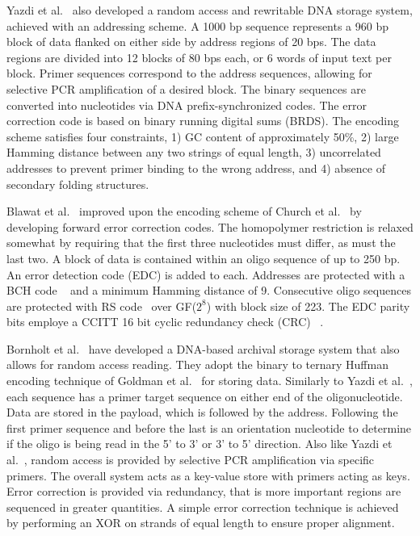 \documentclass{bioinfo}
\begin{document}
Yazdi et al.~\cite{YAZDI2015} also developed a random access and rewritable DNA storage system, achieved with an addressing scheme. A 1000 bp sequence represents a 960 bp block of data flanked on either side by address regions of 20 bps. The data regions are divided into 12 blocks of 80 bps each, or 6 words of input text per block. Primer sequences correspond to the address sequences, allowing for selective PCR amplification of a desired block. The binary sequences are converted into nucleotides via DNA prefix-synchronized codes. The error correction code is based on binary running digital sums (BRDS). The encoding scheme satisfies four constraints, 1) GC content of approximately 50\%, 2) large Hamming distance between any two strings of equal length, 3) uncorrelated addresses to prevent primer binding to the wrong address, and 4) absence of secondary folding structures.

Blawat et al.~\cite{BLAWAT2016} improved upon the encoding scheme of Church et al.~\cite{CHURCH2012} by developing forward error correction codes. The homopolymer restriction is relaxed somewhat by requiring that the first three nucleotides must differ, as must the last two. A block of data is contained within an oligo sequence of up to 250 bp. An error detection code (EDC) is added to each. Addresses are protected with a BCH code ~\cite{BOSE1960} and a minimum Hamming distance of 9. Consecutive oligo sequences are protected with RS code~\cite{REED1960} over GF($2^8$) with block size of 223. The EDC parity bits employe a CCITT 16 bit cyclic redundancy check (CRC) ~\cite{LIN2004}.

Bornholt et al.~\cite{BORNHOLT2016} have developed a DNA-based archival storage system that also allows for random access reading. They adopt the binary to ternary Huffman encoding technique of Goldman et al.~\cite{GOLDMAN2013} for storing data. Similarly to Yazdi et al.~\cite{YAZDI2015}, each sequence has a primer target sequence on either end of the oligonucleotide. Data are stored in the payload, which is followed by the address. Following the first primer sequence and before the last is an orientation nucleotide to determine if the oligo is being read in the 5' to 3' or 3' to 5' direction. Also like Yazdi et al.~\cite{YAZDI2015}, random access is provided by selective PCR amplification via specific primers. The overall system acts as a key-value store with primers acting as keys. Error correction is provided via redundancy, that is more important regions are sequenced in greater quantities. A simple error correction technique is achieved by performing an XOR on strands of equal length to ensure proper alignment.
\end{document}
